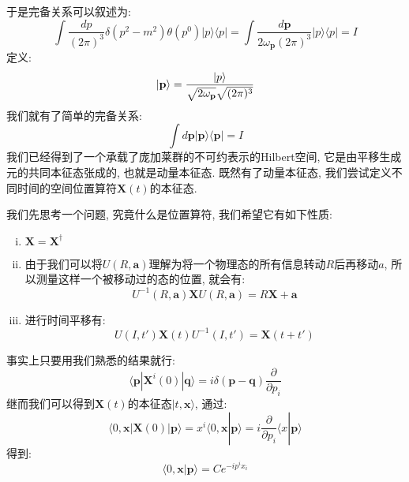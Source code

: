 于是完备关系可以叙述为:
\begin{equation}
    \int \frac{dp}{(2\pi)^3}\delta(p^2-m^2)\theta(p^0)|p\rangle\langle p|=\int \frac{d\mathbf{p}}{2\omega_\mathbf{p}(2\pi)^3}|p\rangle\langle p|=I
\end{equation}
定义:
\begin{equation}
    \ket{\mathbf{p}}=\frac{\ket{p}}{\sqrt{2\omega_\mathbf{p}}\sqrt{(2\pi)^3}}
\end{equation}
我们就有了简单的完备关系:
\begin{equation}
    \int d\mathbf{p}|\mathbf{p}\rangle\langle \mathbf{p}|=I
\end{equation}
我们已经得到了一个承载了庞加莱群的不可约表示的Hilbert空间, 它是由平移生成元的共同本征态张成的, 也就是动量本征态. 既然有了动量本征态, 我们尝试定义不同时间的空间位置算符$\mathbf{X}(t)$的本征态.\par
我们先思考一个问题, 究竟什么是位置算符, 我们希望它有如下性质:
\begin{enumerate}[(i)]
    \item $\mathbf{X}=\mathbf{X}^\dagger$
    \item 由于我们可以将$U(R, \mathbf{a})$理解为将一个物理态的所有信息转动$R$后再移动$a$, 所以测量这样一个被移动过的态的位置, 就会有:
          \begin{equation}
              U^{-1}(R, \mathbf{a})\mathbf{X}U(R, \mathbf{a})=R\mathbf{X}+\mathbf{a}
          \end{equation}
    \item 进行时间平移有:
          \begin{equation}
              U(I, t')\mathbf{X}(t)U^{-1}(I, t')=\mathbf{X}(t+t')
          \end{equation}
\end{enumerate}\par
事实上只要用我们熟悉的结果就行:
\begin{equation}
    \langle \mathbf{p}|\mathbf{X}^i(0)|\mathbf{q}\rangle=i\delta(\mathbf{p}-\mathbf{q})\frac{\partial}{\partial p_i}
\end{equation}
继而我们可以得到$\mathbf{X}(t)$的本征态$|t, \mathbf{x}\rangle$, 通过:
\begin{equation}
    \langle 0, \mathbf{x}|\mathbf{X}(0)|\mathbf{p}\rangle=x^i\langle 0, \mathbf{x}|\mathbf{p}\rangle=i\frac{\partial}{\partial p_i}\langle x|\mathbf{p}\rangle
\end{equation}
得到:
\begin{equation}
    \langle 0, \mathbf{x}|\mathbf{p}\rangle=Ce^{-ip^i x_i}
\end{equation}
